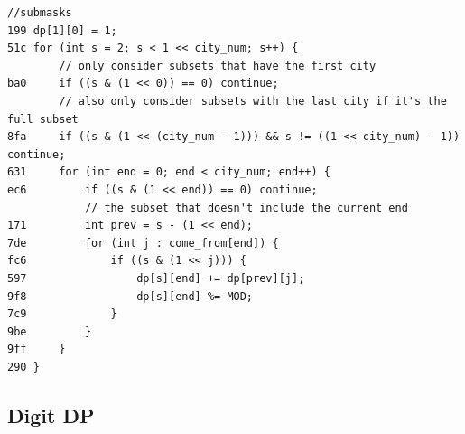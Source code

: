 \documentclass[11pt, a4paper, twoside]{article}
\begin{document}
\begin{lstlisting}
//submasks
199 dp[1][0] = 1;
51c for (int s = 2; s < 1 << city_num; s++) {
    	// only consider subsets that have the first city
ba0 	if ((s & (1 << 0)) == 0) continue;
    	// also only consider subsets with the last city if it's the full subset
8fa 	if ((s & (1 << (city_num - 1))) && s != ((1 << city_num) - 1)) continue;
631 	for (int end = 0; end < city_num; end++) {
ec6 		if ((s & (1 << end)) == 0) continue;
    		// the subset that doesn't include the current end
171 		int prev = s - (1 << end);
7de 		for (int j : come_from[end]) {
fc6 			if ((s & (1 << j))) {
597 				dp[s][end] += dp[prev][j];
9f8 				dp[s][end] %= MOD;
7c9 			}
9be 		}
9ff 	}
290 }
\end{lstlisting}

\subsection{Digit DP}
\end{document}
